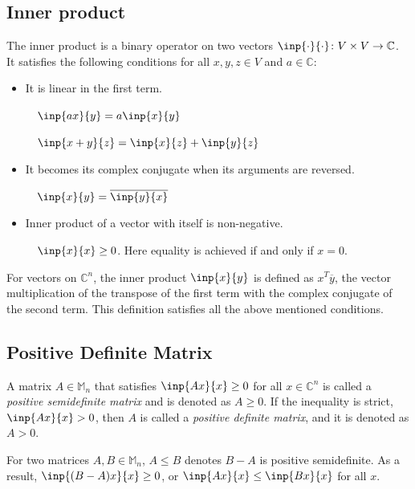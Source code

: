 \documentclass[twoside]{article}
\newcommand*\conj[1]{\overline{#1}}
\newcommand*\trp[1]{#1^T}
\theoremstyle{plain}
\theoremstyle{definition}
\theoremstyle{remark}
\begin{document}
\subsection{Inner product}

The inner product is a binary operator on two vectors \(\inp{\cdot}{\cdot} \colon V  \times  V \to \mathbb{C}\). It  satisfies the following conditions for all \(x, y, z \in V\) and \(a \in \mathbb{C}\):

\begin{itemize}
\item It is linear in the first term. 

\(\quad \inp{ax}{y} = a \inp{x}{y}\)
 
\(\quad \inp{x + y}{z} = \inp{x}{z} + \inp{y}{z}\)

\item It becomes its complex conjugate when its arguments are reversed.

\(\quad \inp{x}{y} = \conj{\inp{y}{x}}\)

\item Inner product of a vector with itself is non-negative. 

\(\quad \inp{x}{x} \ge 0\). Here equality is achieved if and only if \(x = 0\).
\end{itemize}

For vectors on \(\mathbb{C}^n\), the inner product \(\inp{x}{y}\) is defined as \(\trp{x} \conj{y}\), the vector multiplication of the transpose of the first term with the complex conjugate of the second term. This definition satisfies all the above mentioned conditions.

\subsection{Positive Definite Matrix}

A matrix \(A\in \mathbb{M}_n\) that satisfies \(\inp{Ax}{x} \ge 0\) for all \(x \in \mathbb{C}^n\) is called a {\em positive semidefinite matrix} and is denoted as \(A \ge 0\). If the inequality is strict, \(\inp{Ax}{x} > 0\), then \(A\) is called a {\em positive definite matrix}, and it is denoted as \(A > 0\). 

For two matrices \(A, B \in \mathbb{M}_n\), \(A \le B\) denotes \(B - A\) is positive semidefinite. As a result, \(\inp{(B - A)x}{x} \ge 0\), or \(\inp{Ax}{x} \le \inp{Bx}{x}\) for all \(x\).
\end{document}
